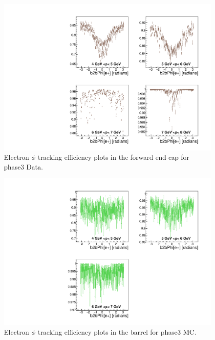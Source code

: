\documentclass[a4paper,11pt,twosided,final,german,openbib,pdftex,listof=totoc,bibliography=totoc]{scrbook}
\begin{document}
\begin{appendix}
\begin{figure}[!htbp]
	\centering
	\includegraphics[width=\textwidth]{Plots/master3/xPMPhiemFC_DataP3}
	\caption[Momentum $\phi$ Electron Forward End-Cap Efficiency Phase3 Data]{Electron $\phi$ tracking efficiency plots in the forward end-cap for phase3 Data.}
	\label{plt:PMPhiemFC3_Data}
\end{figure}




\begin{figure}[!htbp]
	\centering
	\includegraphics[width=\textwidth]{Plots/master3/xPMPhiemBarrel_MCP3}
	\caption[Momentum $\phi$ Electron Barrel Efficiency Phase3 MC]{Electron $\phi$ tracking efficiency plots in the barrel for phase3 MC.}
	\label{plt:PMPhiemBarrel3_MC}
\end{figure}



\end{appendix}
\end{document}
